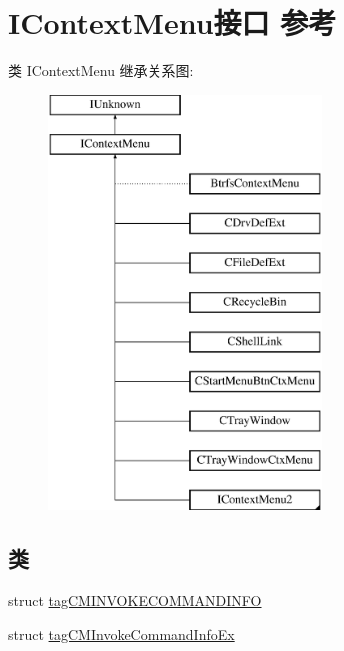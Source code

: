 \hypertarget{interface_i_context_menu}{}\section{I\+Context\+Menu接口 参考}
\label{interface_i_context_menu}
类 I\+Context\+Menu 继承关系图\+:\begin{figure}[H]
\begin{center}
\leavevmode
\includegraphics[height=11.000000cm]{interface_i_context_menu}
\end{center}
\end{figure}
\subsection*{类}
\begin{DoxyCompactItemize}
\item 
struct \hyperlink{struct_i_context_menu_1_1tag_c_m_i_n_v_o_k_e_c_o_m_m_a_n_d_i_n_f_o}{tag\+C\+M\+I\+N\+V\+O\+K\+E\+C\+O\+M\+M\+A\+N\+D\+I\+N\+FO}
\item 
struct \hyperlink{struct_i_context_menu_1_1tag_c_m_invoke_command_info_ex}{tag\+C\+M\+Invoke\+Command\+Info\+Ex}
\end{DoxyCompactItemize}
